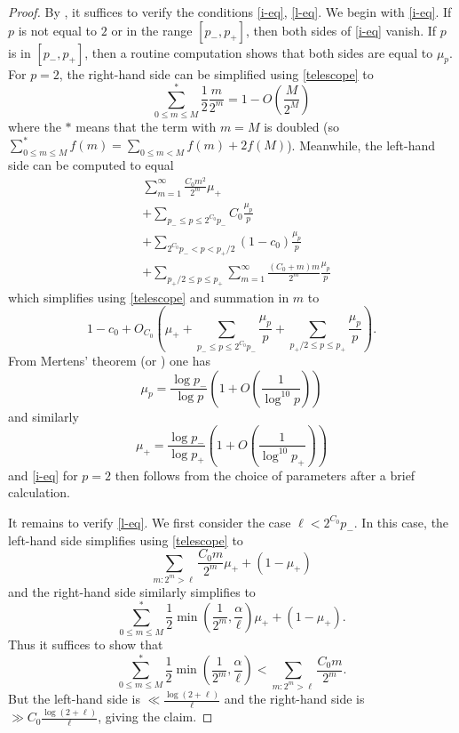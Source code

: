 \documentclass[12pt,a4paper,reqno]{amsart}
\numberwithin{equation}{section}
\theoremstyle{plain}
\theoremstyle{definition}
\begin{document}
\begin{proof}
By , it suffices to verify the conditions \eqref{i-eq}, \eqref{l-eq}.  We begin with \eqref{i-eq}.  If $p$ is not equal to $2$ or in the range $[p_-,p_+]$, then both sides of \eqref{i-eq} vanish.  If $p$ is in $[p_-,p_+]$, then a routine computation shows that both sides are equal to $\mu_p$.  For $p=2$, the right-hand side can be simplified using \eqref{telescope} to
$$ \sum_{0 \leq m \leq M}^* \frac{1}{2} \frac{m}{2^m} = 1 - O\left( \frac{M}{2^M} \right)$$
where the $*$ means that the term with $m=M$ is doubled (so $\sum_{0 \leq m \leq M}^* f(m) = \sum_{0 \leq m<M} f(m) + 2 f(M)$).  Meanwhile, the left-hand side can be computed to equal
\begin{align*}
  &\sum_{m=1}^\infty \frac{C_0 m^2}{2^m} \mu_+ \\
  & + \sum_{p_- \leq p \leq 2^{C_0} p_-} C_0 \frac{\mu_p}{p} \\
  & + \sum_{2^{C_0} p_- < p < p_+/2} (1-c_0) \frac{\mu_p}{p} \\
  & + \sum_{p_+/2 \leq p \leq p_+} \sum_{m=1}^\infty \frac{(C_0+m) m}{2^m} \frac{\mu_p}{p}
\end{align*}
which simplifies using \eqref{telescope} and summation in $m$ to
$$ 1 - c_0 + O_{C_0}\left( \mu_+ + \sum_{p_- \leq p \leq 2^{C_0} p_-} \frac{\mu_p}{p} + \sum_{p_+/2 \leq p \leq p_+} \frac{\mu_p}{p}\right).$$
From Mertens' theorem (or ) one has
\begin{equation}\label{mertens}
  \mu_p = \frac{\log p_-}{\log p} \left( 1 + O\left( \frac{1}{\log^{10} p} \right) \right)
\end{equation}
and similarly
\begin{equation}\label{mertens-2}
  \mu_+ = \frac{\log p_-}{\log p_+} \left( 1 + O\left( \frac{1}{\log^{10} p_+} \right) \right)
\end{equation}
and \eqref{i-eq} for $p=2$ then follows from the choice of parameters after a brief calculation.

It remains to verify \eqref{l-eq}.  We first consider the case $\ell < 2^{C_0} p_-$.  In this case, the left-hand side simplifies using \eqref{telescope} to
$$ \sum_{m: 2^m > \ell} \frac{C_0 m}{2^m} \mu_+ + (1-\mu_+)$$
and the right-hand side similarly simplifies to
$$ \sum_{0 \leq m \leq M}^* \frac{1}{2} \min\left( \frac{1}{2^m}, \frac{\alpha}{\ell}\right) \mu_+ + (1-\mu_+).$$
Thus it suffices to show that
\begin{equation}\label{lint} \sum_{0 \leq m \leq M}^* \frac{1}{2} \min\left( \frac{1}{2^m}, \frac{\alpha}{\ell}\right) < \sum_{m: 2^m > \ell} \frac{C_0 m}{2^m}.
\end{equation}
But the left-hand side is $\ll \frac{\log (2+\ell)}{\ell}$ and the right-hand side is $\gg C_0 \frac{\log (2+\ell)}{\ell}$, giving the claim.


\end{proof}
\end{document}
